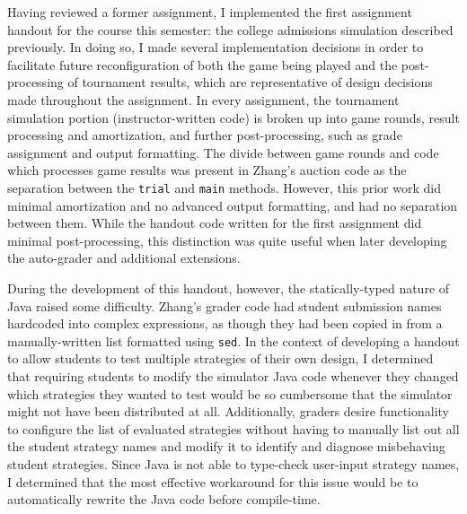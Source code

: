\documentclass[pageno]{jpaper}
\begin{document}
Having reviewed a former assignment, I implemented the first assignment handout for the course this semester: the college admissions simulation described previously.
In doing so, I made several implementation decisions in order to facilitate future reconfiguration of both the game being played and the post-processing of tournament results, which are representative of design decisions made throughout the assignment.
In every assignment, the tournament simulation portion (instructor-written code) is broken up into game rounds, result processing and amortization, and further post-processing, such as grade assignment and output formatting.
The divide between game rounds and code which processes game results was present in Zhang's auction code as the separation between the \texttt{trial} and \texttt{main} methods.
However, this prior work did minimal amortization and no advanced output formatting, and had no separation between them.
While the handout code written for the first assignment did minimal post-processing, this distinction was quite useful when later developing the auto-grader and additional extensions.

During the development of this handout, however, the statically-typed nature of Java raised some difficulty.
Zhang's grader code had student submission names hardcoded into complex expressions, as though they had been copied in from a manually-written list formatted using \texttt{sed}.
In the context of developing a handout to allow students to test multiple strategies of their own design, I determined that requiring students to modify the simulator Java code whenever they changed which strategies they wanted to test would be so cumbersome that the simulator might not have been distributed at all.
Additionally, graders desire functionality to configure the list of evaluated strategies without having to manually list out all the student strategy names and modify it to identify and diagnose misbehaving student strategies.
Since Java is not able to type-check user-input strategy names, I determined that the most effective workaround for this issue would be to automatically rewrite the Java code before compile-time.
\end{document}
